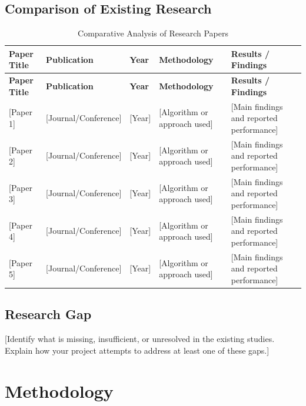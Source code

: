 \documentclass[12pt,a4paper]{report}
\begin{document}
\section{Comparison of Existing Research}

\small
\begin{longtable}{
|p{3.2cm}|p{2.0cm}|p{1.0cm}|p{3.0cm}|p{3.0cm}|
}
\caption{Comparative Analysis of Research Papers}\\
\hline
\textbf{Paper Title} &
\textbf{Publication} &
\textbf{Year} &
\textbf{Methodology} &
\textbf{Results / Findings} \\
\hline
\endfirsthead

\hline
\textbf{Paper Title} &
\textbf{Publication} &
\textbf{Year} &
\textbf{Methodology} &
\textbf{Results / Findings} \\
\hline
\endhead

[Paper 1] & [Journal/Conference] & [Year] &
[Algorithm or approach used] &
[Main findings and reported performance] \\
\hline

[Paper 2] & [Journal/Conference] & [Year] &
[Algorithm or approach used] &
[Main findings and reported performance] \\
\hline

[Paper 3] & [Journal/Conference] & [Year] &
[Algorithm or approach used] &
[Main findings and reported performance] \\
\hline

[Paper 4] & [Journal/Conference] & [Year] &
[Algorithm or approach used] &
[Main findings and reported performance] \\
\hline

[Paper 5] & [Journal/Conference] & [Year] &
[Algorithm or approach used] &
[Main findings and reported performance] \\
\hline

\end{longtable}
\normalsize

\section{Research Gap}

[Identify what is missing, insufficient, or unresolved
in the existing studies. Explain how your project attempts
to address at least one of these gaps.]

\chapter{Methodology}
\end{document}
